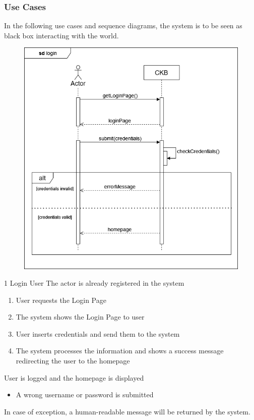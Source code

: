 \subsubsection{Use Cases}
In the following use cases and sequence diagrams, the system is to be seen as black box interacting with the world.
\usecase
{
    \begin{figure}[H]
        \centering
        \includegraphics[width=\textwidth]{src/sd_diagrams/sqlogin.png}
    \end{figure}
}
{1}
{Login}
{User}
{The actor is already registered in the system}
{
    \begin{enumerate}
        \item User requests the Login Page
        \item The system shows the Login Page to user
        \item User inserts credentials and send them to the system
        \item The system processes the information and shows a success message redirecting the user to the homepage
    \end{enumerate}
}
{User is logged and the homepage is displayed}
{
    \begin{itemize}
        \item A wrong username or password is submitted
    \end{itemize}
}
{
    In case of exception, a human-readable message will be returned by the system.
}

